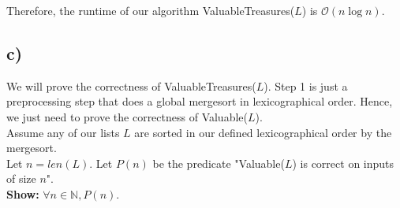 \documentclass[12pt]{article}
\newcommand{\N}{\mathbb{N}}
\begin{document}
Therefore, the runtime of our algorithm ValuableTreasures($L$) is $\mathcal{O}(n\log n)$. 

\subsection*{c)}

We will prove the correctness of ValuableTreasures($L$). Step 1 is just a preprocessing step that does a global mergesort in lexicographical order. Hence, we just need to prove the correctness of Valuable($L$). \\

Assume any of our lists $L$ are sorted in our defined lexicographical order by the mergesort. \\

Let $n = len(L)$. Let $P(n)$ be the predicate "Valuable($L$) is correct on inputs of size $n$". \\

\textbf{Show:} $\forall n \in \N, P(n)$.
\end{document}
